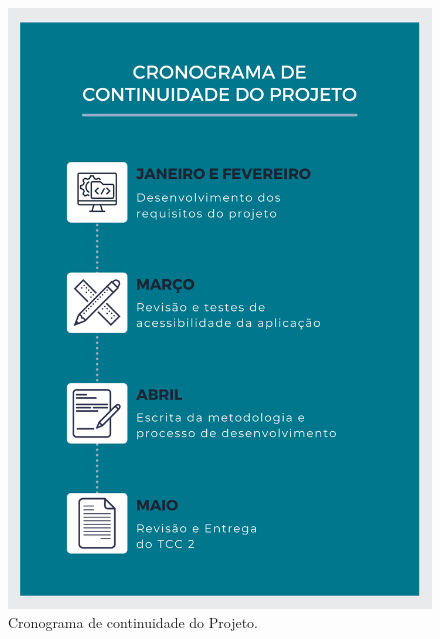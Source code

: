 \begin{figure}[htb]
    \caption{\label{fig_cro_con}Cronograma de continuidade do Projeto.}
    \begin{center}
        \includegraphics[scale=0.65]{Imagens/proposta/cronograma_continuidade.png}
    \end{center}
\end{figure}